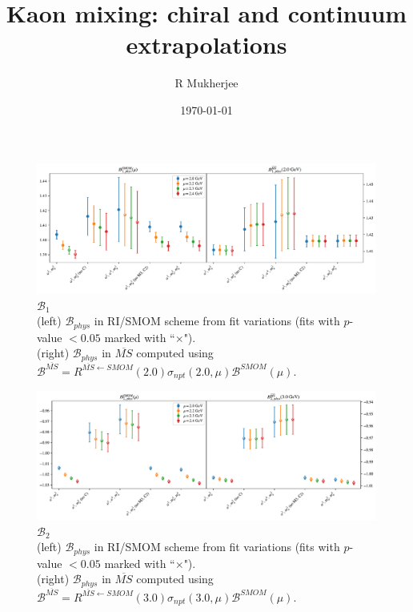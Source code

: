 \documentclass[12pt]{extarticle}
\title{Kaon mixing: chiral and continuum extrapolations}
\author{R Mukherjee}
\date{\today}
\begin{document}
\maketitle
\tableofcontents
\clearpage
\begin{figure}
\centering
\includegraphics[page=1, width=1.1\textwidth]{VVpAA/NPR/fit_summary.pdf}
\caption{$\mathcal{B}_{1}$\\(left) $\mathcal{B}_{phys}$ in RI/SMOM scheme from fit variations (fits with $p$-value $<0.05$ marked with ``$\times$"). \\(right) $\mathcal{B}_{phys}$ in $\overline{MS}$ computed using $\mathcal{B}^{\overline{MS}} = R^{\overline{MS}\leftarrow SMOM}(2.0)\sigma_{npt}(2.0,\mu) \mathcal{B}^{SMOM}(\mu)$.}
\end{figure}
\clearpage
\begin{figure}
\centering
\includegraphics[page=1, width=1.1\textwidth]{VVmAA/NPR/fit_summary.pdf}
\caption{$\mathcal{B}_{2}$\\(left) $\mathcal{B}_{phys}$ in RI/SMOM scheme from fit variations (fits with $p$-value $<0.05$ marked with ``$\times$"). \\(right) $\mathcal{B}_{phys}$ in $\overline{MS}$ computed using $\mathcal{B}^{\overline{MS}} = R^{\overline{MS}\leftarrow SMOM}(3.0)\sigma_{npt}(3.0,\mu) \mathcal{B}^{SMOM}(\mu)$.}
\end{figure}
\clearpage
\end{document}
